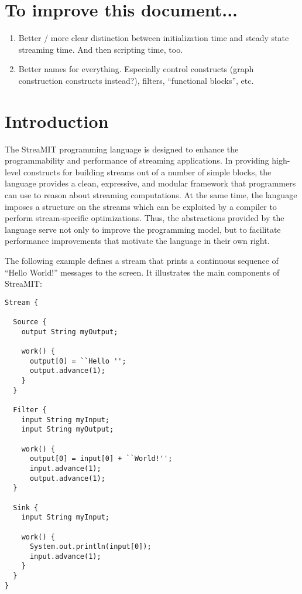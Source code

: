 \documentclass[draft]{article}
\begin{document}
\section{To improve this document...}

\begin{enumerate}

\item Better / more clear distinction between initialization time and
steady state streaming time.  And then scripting time, too.

\item Better names for everything.  Especially control constructs
(graph construction constructs instead?), filters, ``functional
blocks'', etc.

\end{enumerate}

\section{Introduction}
\label{sec:intro}

The StreaMIT programming language is designed to enhance the
programmability and performance of streaming applications.  In
providing high-level constructs for building streams out of a number
of simple blocks, the language provides a clean, expressive, and
modular framework that programmers can use to reason about streaming
computations.  At the same time, the language imposes a structure on
the streams which can be exploited by a compiler to perform
stream-specific optimizations.  Thus, the abstractions provided by the
language serve not only to improve the programming model, but to
facilitate performance improvements that motivate the language in
their own right.

The following example defines a stream that prints a continuous
sequence of ``Hello World!'' messages to the screen.  It illustrates
the main components of StreaMIT:

\begin{verbatim}
Stream {

  Source {
    output String myOutput;

    work() {
      output[0] = ``Hello '';
      output.advance(1);
    }
  }

  Filter {
    input String myInput;
    input String myOutput;

    work() {
      output[0] = input[0] + ``World!'';
      input.advance(1);
      output.advance(1);
  }

  Sink {
    input String myInput;
    
    work() {
      System.out.println(input[0]);
      input.advance(1);
    }
  }
}
\end{verbatim}
\end{document}
